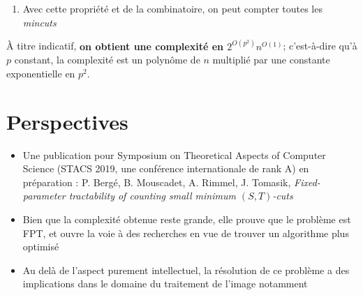 \documentclass[a0,portrait]{a0poster}
\begin{document}
\begin{multicols}{2}
\begin{enumerate}
  \item Avec cette propriété et de la combinatoire, on peut compter toutes les \textit{mincuts}
\end{enumerate}


À titre indicatif, \textbf{on obtient une complexité en $2^{O(p^2)}n^{O(1)}$}; c'est-à-dire qu'à $p$ constant, la complexité est un polynôme de $n$ multiplié par une constante exponentielle en $p^2$.


\color{NavyBlue} 

\section*{Perspectives}

\begin{itemize}
  \item \color{Red} Une publication pour Symposium on Theoretical Aspects of Computer Science (STACS 2019, une conférence internationale de rank A) en préparation : P. Bergé, B. Mouscadet, A. Rimmel, J. Tomasik, \textit{Fixed-parameter tractability of counting small minimum $(S,T)$-cuts}
  \color{NavyBlue} 
  \item Bien que la complexité obtenue reste grande, elle prouve que le problème est FPT, et ouvre la voie à des recherches en vue de trouver un algorithme plus optimisé 
  \item Au delà de l'aspect purement intellectuel, la résolution de ce problème a des implications dans le domaine du traitement de l'image notamment
\end{itemize}
\color{Black}
\end{multicols}
\end{document}
